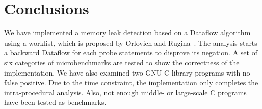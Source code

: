 \section{Conclusions}

We have implemented a memory leak detection based on a Dataflow algorithm using 
a worklist, which is proposed by Orlovich and Rugina~\cite{rugina}. The analysis 
starts a backward Dataflow for each probe statements to disprove its negation. 
A set of six categories of microbenchmarks are tested to show the correctness 
of the implementation. We have also examined two GNU C library programs with no 
false positive. Due to the time constraint, the implementation only completes 
the intra-procedural analysis. Also, not enough middle- or large-scale C 
programs have been tested as benchmarks.
